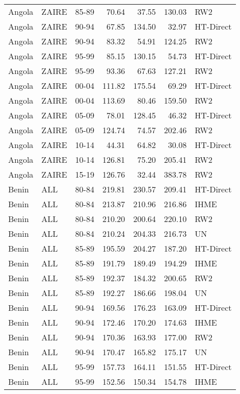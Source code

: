 \begin{longtable}{lllrrrl}
  Angola & ZAIRE & 85-89 & 70.64 & 37.55 & 130.03 & RW2 \\ 
  Angola & ZAIRE & 90-94 & 67.85 & 134.50 & 32.97 & HT-Direct \\ 
  Angola & ZAIRE & 90-94 & 83.32 & 54.91 & 124.25 & RW2 \\ 
  Angola & ZAIRE & 95-99 & 85.15 & 130.15 & 54.73 & HT-Direct \\ 
  Angola & ZAIRE & 95-99 & 93.36 & 67.63 & 127.21 & RW2 \\ 
  Angola & ZAIRE & 00-04 & 111.82 & 175.54 & 69.29 & HT-Direct \\ 
  Angola & ZAIRE & 00-04 & 113.69 & 80.46 & 159.50 & RW2 \\ 
  Angola & ZAIRE & 05-09 & 78.01 & 128.45 & 46.32 & HT-Direct \\ 
  Angola & ZAIRE & 05-09 & 124.74 & 74.57 & 202.46 & RW2 \\ 
  Angola & ZAIRE & 10-14 & 44.31 & 64.82 & 30.08 & HT-Direct \\ 
  Angola & ZAIRE & 10-14 & 126.81 & 75.20 & 205.41 & RW2 \\ 
  Angola & ZAIRE & 15-19 & 126.76 & 32.44 & 383.78 & RW2 \\ 
  Benin & ALL & 80-84 & 219.81 & 230.57 & 209.41 & HT-Direct \\ 
  Benin & ALL & 80-84 & 213.87 & 210.96 & 216.86 & IHME \\ 
  Benin & ALL & 80-84 & 210.20 & 200.64 & 220.10 & RW2 \\ 
  Benin & ALL & 80-84 & 210.24 & 204.33 & 216.73 & UN \\ 
  Benin & ALL & 85-89 & 195.59 & 204.27 & 187.20 & HT-Direct \\ 
  Benin & ALL & 85-89 & 191.79 & 189.49 & 194.29 & IHME \\ 
  Benin & ALL & 85-89 & 192.37 & 184.32 & 200.65 & RW2 \\ 
  Benin & ALL & 85-89 & 192.27 & 186.66 & 198.04 & UN \\ 
  Benin & ALL & 90-94 & 169.56 & 176.23 & 163.09 & HT-Direct \\ 
  Benin & ALL & 90-94 & 172.46 & 170.20 & 174.63 & IHME \\ 
  Benin & ALL & 90-94 & 170.36 & 163.93 & 177.00 & RW2 \\ 
  Benin & ALL & 90-94 & 170.47 & 165.82 & 175.17 & UN \\ 
  Benin & ALL & 95-99 & 157.73 & 164.11 & 151.55 & HT-Direct \\ 
  Benin & ALL & 95-99 & 152.56 & 150.34 & 154.78 & IHME \\ 

\end{longtable}
